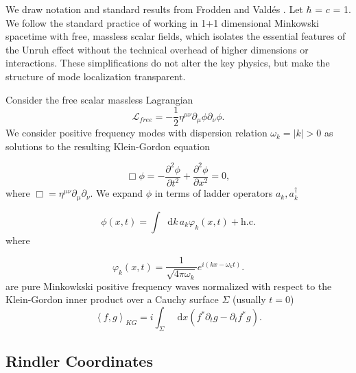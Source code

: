 \documentclass[12pt,a4paper]{article}
\newcommand*\diff{\mathop{}\!\mathrm{d}}
\begin{document}
We draw notation and standard results from Frodden and Vald{\'{e}}s \cite{frodden2018unruh}. Let $\hbar$ = $c$ = 1. We follow the standard practice of working in 1+1 dimensional Minkowski spacetime with free, massless scalar fields, which isolates the essential features of the Unruh effect without the technical overhead of higher dimensions or interactions. These simplifications do not alter the key physics, but make the structure of mode localization transparent.

Consider the free scalar massless Lagrangian
\begin{equation}
\mathscr{L}_{free} = -\frac{1}{2} \eta^{\mu\nu}\partial_\mu \phi \partial_\nu \phi.
\end{equation}
We consider positive frequency modes with dispersion relation $\omega_k = |k| > 0$ as solutions to the resulting Klein-Gordon equation 

\begin{equation}
  \Box \phi = -\frac{\partial^2 \phi}{\partial t^2} + \frac{\partial^2 \phi}{\partial x^2} = 0,
 \label{massless-wave-eq}
\end{equation}
where $\Box = \eta^{\mu\nu} \partial_\mu \partial_\nu$. We expand $\phi$ in terms of ladder operators $a_k, a_k^\dagger$

\begin{equation}
  \phi(x,t) = \int \diff k \, a_k \varphi_k(x,t) + \text{h.c.}
\end{equation}
where

\begin{equation}
  \varphi_k(x,t) = \frac{1}{\sqrt{4\pi\omega_k}} e^{i(kx - \omega_k t)}.
\label{amode}
\end{equation}
are pure Minkowkski positive frequency waves normalized with respect to the Klein-Gordon inner product over a Cauchy surface $\Sigma$ (usually $t = 0$)
\begin{equation}
  \left<f, g\right>_{KG} = i \int_\Sigma \diff x (f^* \partial_t g - \partial_t f^* g).
\end{equation}

\subsection{Rindler Coordinates} 
\end{document}
